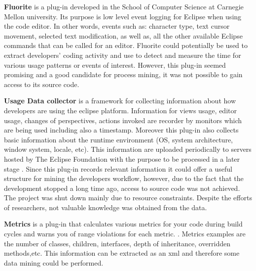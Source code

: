 \textbf{Fluorite} is a plug-in developed in the School of Computer Science 
at Carnegie Mellon university. Its purpose is low level event logging 
for Eclipse when using the code editor. In other words, events such as: 
character type, text cursor movement, 
selected text modification, as well as, all
the other available Eclipse commands that can be called for an editor.
Fluorite could potentially be used to extract developers' coding 
activity and use to detect and measure the time for various usage 
patterns or events of interest. However, this plug-in seemed promising 
and a good candidate for process mining, it was not possible to gain 
access to its source code.
 
\textbf{Usage Data collector} is a framework for collecting information about how developers 
are using the eclipse platform. Information for views usage, editor usage, 
changes of perspectives, actions invoked are recorder by monitors which
are being used including also a timestamp. Moreover this plug-in also collects 
basic information about the runtime environment (OS, system architecture, window system, 
locale, etc). This information are uploaded periodically to servers hosted by The Eclipse 
Foundation with the purpose to be processed in a later stage .
Since this plug-in records relevant information it could offer a useful structure for mining the developers workflow, 
however, due to the fact that the development stopped a long time ago, access to source code was not achieved.
The project was shut down mainly due to resource constraints. Despite the efforts of researchers, not valuable 
knowledge was obtained from the data. 

\textbf{Metrics} is a plug-in that calculates various metrics for your code during build cycles and warns you of range violations for each metric.
. 
Metrics examples are the number of classes, children, interfaces, depth of inheritance, overridden methods,etc.
This information can be extracted as an xml and therefore some data mining could be performed.

